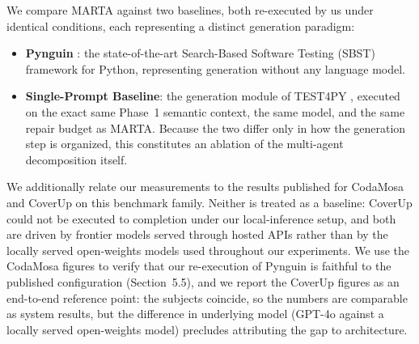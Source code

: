 We compare MARTA against two baselines, both re-executed by us under identical
conditions, each representing a distinct generation paradigm:
\begin{itemize}
    \item \textbf{Pynguin} \cite{lukasczyk2022pynguin}: the state-of-the-art
    Search-Based Software Testing (SBST) framework for Python, representing
    generation without any language model.
    \item \textbf{Single-Prompt Baseline}: the generation module of TEST4PY
    \cite{test4py2025}, executed on the exact same Phase~1 semantic context, the same
    model, and the same repair budget as MARTA. Because the two differ only in how the
    generation step is organized, this constitutes an ablation of the multi-agent
    decomposition itself.
\end{itemize}

We additionally relate our measurements to the results published for CodaMosa
\cite{lemieux2023codamosa} and CoverUp \cite{altmayer2025coverup} on this benchmark
family. Neither is treated as a baseline: CoverUp could not be executed to completion
under our local-inference setup, and both are driven by frontier models served through
hosted APIs rather than by the locally served open-weights models used throughout our
experiments. We use the CodaMosa figures to verify that our re-execution of Pynguin is
faithful to the published configuration (Section~5.5), and we report the CoverUp
figures as an end-to-end reference point: the subjects coincide, so the numbers are
comparable as system results, but the difference in underlying model (GPT-4o against
a locally served open-weights model) precludes attributing the gap to architecture.


